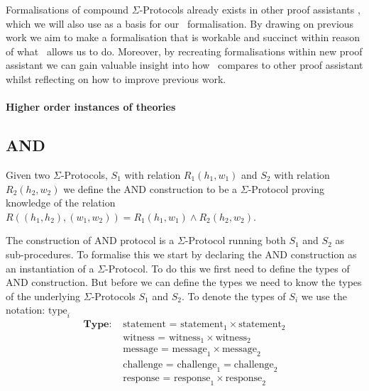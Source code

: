 Formalisations of compound $\Sigma$-Protocols already exists in other proof
assistants \cite{cryptoeprint:2019:1185,certicrypt_sigma}, which we will also
use as a basis for our \easycrypt\ formalisation. By drawing on previous work we
aim to make a formalisation that is workable and succinct within reason of what
\easycrypt\ allows us to do. Moreover, by recreating formalisations within new
proof assistant we can gain valuable insight into how \easycrypt\ compares to
other proof assistant whilst reflecting on how to improve previous work.

\paragraph{Higher order instances of theories} 

\subsection{AND}
\label{subsec:sigma_AND}
Given two $\Sigma$-Protocols, $S_{1}$ with relation $R_{1}(h_{1},w_{1})$ and
$S_{2}$ with relation $R_{2}(h_{2},w_{2})$ we define the AND construction to be a
$\Sigma$-Protocol proving knowledge of the relation
$R((h_{1}, h_{2}), (w_{1}, w_{2})) = R_{1}(h_{1}, w_{1}) \land R_{2}(h_{2}, w_{2})$.

The construction of AND protocol is a $\Sigma$-Protocol running both
$S_{1}$ and $S_{2}$ as sub-procedures. To formalise this we start by declaring
the AND construction as an instantiation of a $\Sigma$-Protocol. To do this we
first need to define the types of AND construction. But before we
can define the types we need to know the types of the
underlying $\Sigma$-Protocols $S_{1}$ and $S_{2}$. To denote the types of
$S_{i}$ we use the notation: $\text{type}_i$
\begin{align*}
  \textbf{Type: } &\text{statement = statement}_{1} \times \text{statement}_{2} \\
                  &\text{witness = witness}_{1} \times \text{witness}_{2} \\
                  &\text{message = message}_{1} \times \text{message}_{2} \\
                  &\text{challenge = challenge}_{1} = \text{challenge}_{2} \\
                  &\text{response = response}_{1} \times \text{response}_{2} \\
\end{align*}

